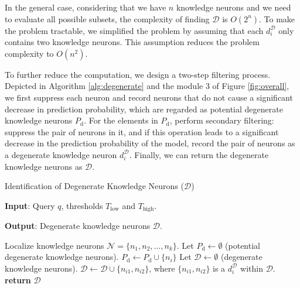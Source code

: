 \documentclass[]{article}
\begin{document}
In the general case, considering that we have \(n\) knowledge neurons and we need to evaluate all possible subsets, the complexity of finding \(\mathcal{D}\) is \(O(2^n)\). To make the problem tractable, we simplified the problem by assuming that each \( d^{\mathcal{D}}_i \) only contains two knowledge neurons. This assumption reduces the problem complexity to \(O(n^2)\). 

To further reduce the computation, we design a two-step filtering process. Depicted in Algorithm \ref{alg:degenerate} and the module 3 of Figure \ref{fig:overall}, we first suppress each neuron and record neurons that do not cause a significant decrease in prediction probability, which are regarded as potential degenerate knowledge neurons $P_{\text{d}}$. For the elements in $P_{\text{d}}$, perform secondary filtering: suppress the pair of neurons in it, and if this operation leads to a significant decrease in the prediction probability of the model, record the pair of neurons as a degenerate knowledge neuron $d_i^{\mathcal{D}}$. Finally, we can return the degenerate knowledge neurons as \(\mathcal{D}\).
\begin{algorithm}[tb]
\caption{Identification of Degenerate Knowledge Neurons ($\mathcal{D}$)}
\label{alg:degenerate}
\textbf{Input}: Query $q$, thresholds $T_{\text{low}}$ and $T_{\text{high}}$.

\textbf{Output}: Degenerate knowledge neurons $\mathcal{D}$.

\begin{algorithmic}[1] %
\STATE Localize knowledge neurons \(\mathcal{N}=\{n_1, n_2, \ldots, n_k\}\).
\STATE Let \(P_{\text{d}} \leftarrow \emptyset\) (potential degenerate knowledge neurons).
\STATE \(P_{\text{d}} \leftarrow P_{\text{d}} \cup \{n_i\}\)
\ENDIF
\ENDFOR
\STATE Let \(\mathcal{D} \leftarrow \emptyset\) (degenerate knowledge neurons).
\STATE \(\mathcal{D} \leftarrow \mathcal{D} \cup \{n_{i1}, n_{i2}\}\),
where $\{n_{i1}, n_{i2}\}$ is a $d_{i}^{\mathcal{D}}$ within \(\mathcal{D}\).
\ENDIF
\ENDFOR
\STATE \textbf{return} \(\mathcal{D}\)
\end{algorithmic}
\end{algorithm}
\end{document}
